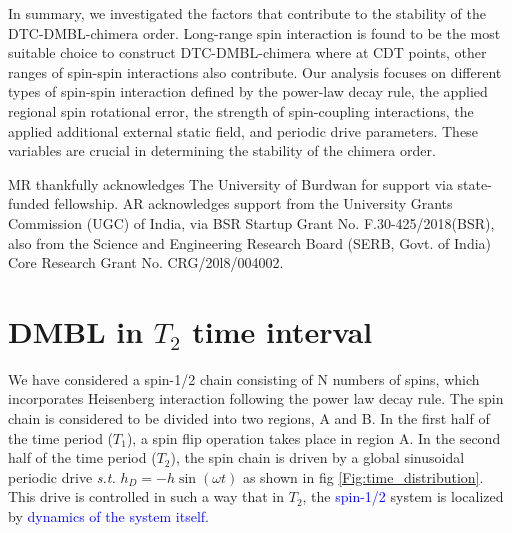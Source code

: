 \documentclass[%
reprint,
superscriptaddress,
amsmath,amssymb,showkeys,
aps,
prb,
]{revtex4-2}
\newcommand{\blue}[1]{\textcolor{blue}{#1}}
\begin{document}
	In summary, we investigated the factors that contribute to the stability of the DTC-DMBL-chimera order. Long-range spin interaction is found to be the most suitable choice to construct DTC-DMBL-chimera where at CDT points, other ranges of spin-spin interactions also contribute. Our analysis focuses on different types of spin-spin interaction defined by the power-law decay rule, the applied regional spin rotational error, the strength of spin-coupling interactions, the applied additional external static field, and periodic drive parameters. These variables are crucial in determining the stability of the chimera order.\\
	
	
\begin{acknowledgments}
	MR thankfully acknowledges The University of Burdwan for support via state-funded fellowship. AR acknowledges support from the University Grants Commission (UGC) of India, via BSR Startup Grant No. F.30-425/2018(BSR), also from the Science and Engineering Research Board (SERB, Govt. of India) Core Research Grant No. CRG/20l8/004002.
\end{acknowledgments}
	
	
	\newpage
	\clearpage
	\appendix
	\onecolumngrid
	\section{ \label{appendixA} DMBL in $T_2$ time interval}
	
	We have considered a spin-1/2 chain consisting of N numbers of spins, which  incorporates Heisenberg interaction following the power law decay rule. The spin chain is considered to be divided into two regions, A and B. In the first half of the time period ($T_1$), a spin flip operation takes place in region A. In the second half of the time period ($T_2$), the spin chain is driven by a global sinusoidal periodic drive \textit{s.t.} $h_D = -h\sin(\omega t)$ as shown in fig \ref{Fig:time_distribution}. This drive is controlled in such a way that in $T_2$, the \blue{spin-1/2} system is localized by \blue{dynamics of the system itself}.
	
\end{document}
